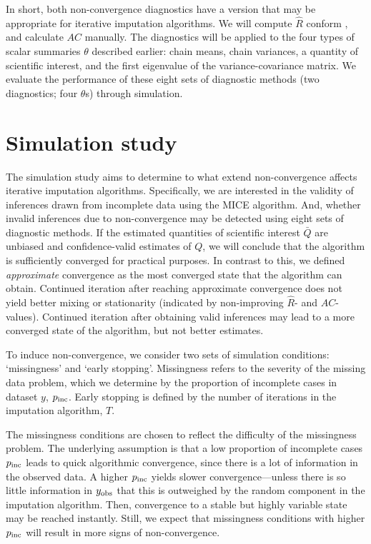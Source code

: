 \documentclass[Royal,times,sageh]{sagej}
\begin{document}
In short, both non-convergence diagnostics have a version that may be appropriate for iterative imputation algorithms. We will compute \(\widehat{R}\) conform \citet{veht19}, and calculate \(AC\) manually. The diagnostics will be applied to the four types of scalar summaries \(\theta\) described earlier: chain means, chain variances, a quantity of scientific interest, and the first eigenvalue of the variance-covariance matrix. We evaluate the performance of these eight sets of diagnostic methods (two diagnostics; four \(\theta\)s) through simulation.

\hypertarget{simulation-study}{%
\section{Simulation study}\label{simulation-study}}

The simulation study aims to determine to what extend non-convergence affects iterative imputation algorithms. Specifically, we are interested in the validity of inferences drawn from incomplete data using the MICE algorithm. And, whether invalid inferences due to non-convergence may be detected using eight sets of diagnostic methods. If the estimated quantities of scientific interest \(\bar{Q}\) are unbiased and confidence-valid estimates of \({Q}\), we will conclude that the algorithm is sufficiently converged for practical purposes. In contrast to this, we defined \emph{approximate} convergence as the most converged state that the algorithm can obtain. Continued iteration after reaching approximate convergence does not yield better mixing or stationarity (indicated by non-improving \(\widehat{R}\)- and \(AC\)-values). Continued iteration after obtaining valid inferences may lead to a more converged state of the algorithm, but not better estimates.

To induce non-convergence, we consider two sets of simulation conditions: `missingness' and `early stopping'. Missingness refers to the severity of the missing data problem, which we determine by the proportion of incomplete cases in dataset \(y\), \(p_{\rm inc}\). Early stopping is defined by the number of iterations in the imputation algorithm, \(T\).

The missingness conditions are chosen to reflect the difficulty of the missingness problem. The underlying assumption is that a low proportion of incomplete cases \(p_{\rm inc}\) leads to quick algorithmic convergence, since there is a lot of information in the observed data. A higher \(p_{\rm inc}\) yields slower convergence---unless there is so little information in \(y_{\rm obs}\) that this is outweighed by the random component in the imputation algorithm. Then, convergence to a stable but highly variable state may be reached instantly. Still, we expect that missingness conditions with higher \(p_{\rm inc}\) will result in more signs of non-convergence.
\end{document}
